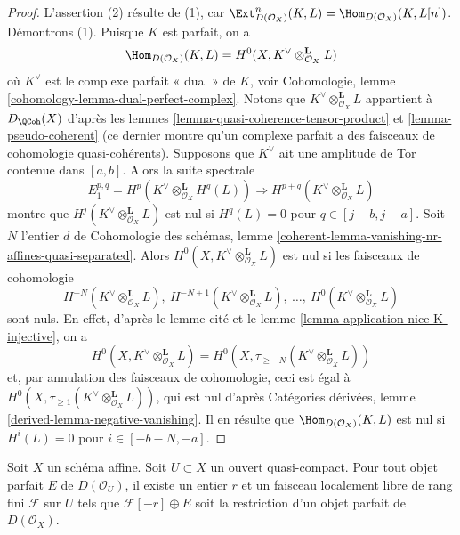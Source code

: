 \begin{proof}
L'assertion (2) résulte de (1), car $\Ext^n_{D(\mathcal{O}_X)}(K, L) =
\Hom_{D(\mathcal{O}_X)}(K, L[n])$. Démontrons (1).
Puisque $K$ est parfait, on a
$$
\Hom_{D(\mathcal{O}_X)}(K, L) =
H^0(X, K^\vee \otimes_{\mathcal{O}_X}^\mathbf{L} L)
$$
où $K^\vee$ est le complexe parfait « dual » de $K$, voir
Cohomologie, lemme \ref{cohomology-lemma-dual-perfect-complex}.
Notons que $K^\vee \otimes_{\mathcal{O}_X}^\mathbf{L} L$
appartient à $D_\QCoh(X)$ d'après les
lemmes \ref{lemma-quasi-coherence-tensor-product} et
\ref{lemma-pseudo-coherent} (ce dernier montre qu'un complexe parfait
a des faisceaux de cohomologie quasi-cohérents). Supposons que $K^\vee$ ait
une amplitude de Tor contenue dans $[a, b]$. Alors la suite spectrale
$$
E_1^{p, q} = H^p(K^\vee \otimes_{\mathcal{O}_X}^\mathbf{L} H^q(L))
\Rightarrow
H^{p + q}(K^\vee \otimes_{\mathcal{O}_X}^\mathbf{L} L)
$$
montre que $H^j(K^\vee \otimes_{\mathcal{O}_X}^\mathbf{L} L)$
est nul si $H^q(L) = 0$ pour $q \in [j - b, j - a]$.
Soit $N$ l'entier $d$ de Cohomologie des schémas,
lemme \ref{coherent-lemma-vanishing-nr-affines-quasi-separated}.
Alors $H^0(X, K^\vee \otimes_{\mathcal{O}_X}^\mathbf{L} L)$
est nul si les faisceaux de cohomologie
$$
H^{-N}(K^\vee \otimes_{\mathcal{O}_X}^\mathbf{L} L),
\ H^{-N + 1}(K^\vee \otimes_{\mathcal{O}_X}^\mathbf{L} L),
\ \ldots,
\ H^0(K^\vee \otimes_{\mathcal{O}_X}^\mathbf{L} L)
$$
sont nuls. En effet, d'après le lemme cité et le
lemme \ref{lemma-application-nice-K-injective}, on a
$$
H^0(X, K^\vee \otimes_{\mathcal{O}_X}^\mathbf{L} L) =
H^0(X, \tau_{\geq -N}(K^\vee \otimes_{\mathcal{O}_X}^\mathbf{L} L))
$$
et, par annulation des faisceaux de cohomologie, ceci est égal à
$H^0(X, \tau_{\geq 1}(K^\vee \otimes_{\mathcal{O}_X}^\mathbf{L} L))$,
qui est nul d'après Catégories dérivées, lemme
\ref{derived-lemma-negative-vanishing}.
Il en résulte que $\Hom_{D(\mathcal{O}_X)}(K, L)$ est nul si
$H^i(L) = 0$ pour $i \in [-b - N, -a]$.
\end{proof}

\begin{lemma}
\label{lemma-lift-perfect-complex-plus-locally-free}
Soit $X$ un schéma affine. Soit $U \subset X$ un ouvert quasi-compact.
Pour tout objet parfait $E$ de $D(\mathcal{O}_U)$, il existe un entier
$r$ et un faisceau localement libre de rang fini $\mathcal{F}$ sur $U$ tels que
$\mathcal{F}[-r] \oplus E$ soit la restriction d'un objet parfait de
$D(\mathcal{O}_X)$.
\end{lemma}

